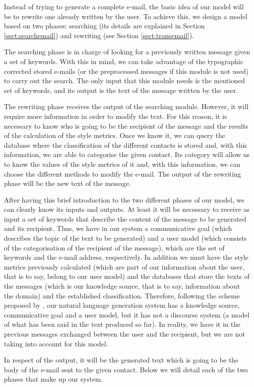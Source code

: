 Instead of trying to generate a complete e-mail, the basic idea of our model will be to rewrite one already written by the user. To achieve this, we design a model based on two phases: searching (its details are explained in Section \ref{sect:searchemail}) and rewriting (see Section \ref{sect:transemail}).

The searching phase is in charge of looking for a previously written message given a set of keywords. With this in mind, we can take advantage of the typographic corrected stored e-mails (or the preprocessed messages if this module is not used) to carry out the search. The only input that this module needs is the mentioned set of keywords, and its output is the text of the message written by the user.

The rewriting phase receives the output of the searching module. However, it will require more information in order to modify the text. For this reason, it is necessary to know who is going to be the recipient of the message and the results of the calculation of the style metrics. Once we know it, we can query the database where the classification of the different contacts is stored and, with this information, we are able to categorise the given contact. Its category will allow us to know the values of the style metrics of it and, with this information, we can choose the different methods to modify the e-mail. The output of the rewriting phase will be the new text of the message.

After having this brief introduction to the two different phases of our model, we can clearly know its inputs and outputs. At least it will be necessary to receive as input a set of keywords that describe the content of the message to be generated and its recipient. Thus, we have in our system a communicative goal (which describes the topic of the text to be generated) and a user model (which consists of the categorisation of the recipient of the message), which are the set of keywords and the e-mail address, respectively. In addition we must have the style metrics previously calculated (which are part of our information about the user, that is to say, belong to our user model) and the databases that store the texts of the messages (which is our knowledge source, that is to say, information about the domain) and the established classification. Therefore, following the scheme proposed by \cite{reiter2000building}, our natural language generation system has a knowledge source, communicative goal and a user model, but it has not a discourse system (a model of what has been said in the text produced so far). In reality, we have it in the previous messages exchanged between the user and the recipient, but we are not taking into account for this model.

In respect of the output, it will be the generated text which is going to be the body of the e-mail sent to the given contact. Below we will detail each of the two phases that make up our system.
